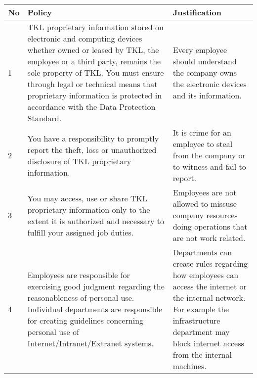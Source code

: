 \documentclass{article}
\begin{document}
\begin{center}
    \begin{longtable}{|p{1cm}|p{5cm}|p{5cm}|}
        \hline
        No
         &
        Policy
         &
        Justification                                                                                                                                                                                         \\
        \hline

        1
         &
        TKL proprietary information stored on electronic and computing devices whether owned or leased by TKL, the employee or a third party, remains the sole property of TKL. You must ensure through legal or technical  means that proprietary information is protected in accordance with the Data Protection Standard.
         &
        Every employee should understand the company owns the electronic devices and its information.                                                                                                         \\
        \hline

        2
         &
        You have a responsibility to promptly report the theft, loss or unauthorized disclosure of TKL proprietary information.
         &
        It is crime for an employee to steal from the company or to witness and fail to report.                                                                                                               \\
        \hline

        3
         &
        You may access, use or share TKL proprietary information only to the
        extent it is authorized and necessary to fulfill your assigned job duties.
         &
        Employees are not allowed to missuse company resources doing operations that are not work related.                                                                                                    \\
        \hline

        4
         &
        Employees are responsible for exercising good judgment regarding the reasonableness of
        personal use. Individual departments are responsible for creating guidelines concerning
        personal use of Internet/Intranet/Extranet systems.
         &
        Departments can create rules regarding how employees can access the internet or the internal network. For example the infrastructure department may block internet access from the internal machines. \\
        \hline


\end{longtable}
\end{center}
\end{document}
